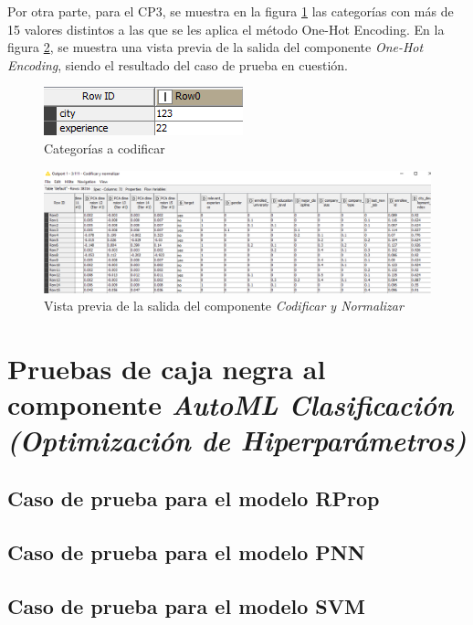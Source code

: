 Por otra parte, para el CP3, se muestra en la figura \ref{fig:categorias-a-codificar} las categorías con más de 15 valores distintos a las que se les aplica el método One-Hot Encoding. En la figura \ref{fig:resultado-cp3-codif-norm}, se muestra una vista previa de la salida del componente \textit{One-Hot Encoding}, siendo el resultado del caso de prueba en cuestión. 

\begin{figure}[H]
	\centering
	\includegraphics[width=0.4\linewidth]{"figuras/capi 3/pruebas-jenn/categorias-a-codificar"}
	\caption{Categorías a codificar}
	\label{fig:categorias-a-codificar}
\end{figure}

\begin{figure}[H]
	\centering
	\includegraphics[width=0.8\linewidth]{"figuras/capi 3/pruebas-jenn/resultado-cp3-codif-norm"}
	\caption{Vista previa de la salida del componente \textit{Codificar y Normalizar}}
	\label{fig:resultado-cp3-codif-norm}
\end{figure}


\section{Pruebas de caja negra al componente \textit{AutoML Clasificación (Optimización de Hiperparámetros)}}

\subsection{Caso de prueba para el modelo RProp}

\subsection{Caso de prueba para el modelo PNN}

\subsection{Caso de prueba para el modelo SVM}

